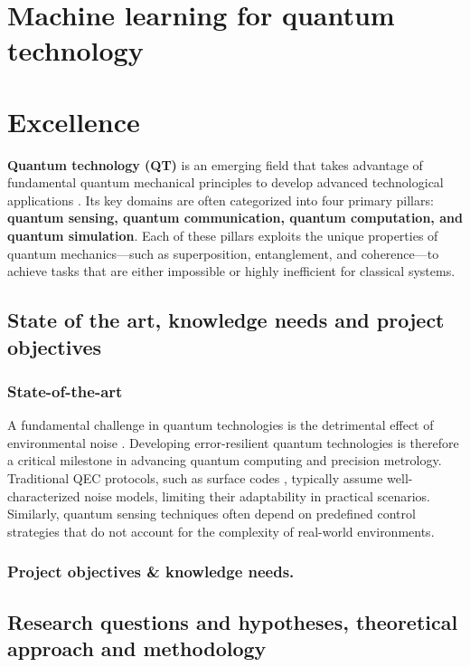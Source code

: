 \documentclass{scrreprt}
\author{Francesco Massel}
\date{\today}
\title{}
\begin{document}
\section*{\LARGE{Machine learning for quantum technology}}


\section{Excellence}
\label{sec:orgc59a8d0}
\textbf{Quantum technology (QT)} is an emerging field that takes advantage of fundamental quantum mechanical principles to develop advanced technological applications \cite{macfarlane_quantum_2003-1, acin_quantum_2018}. Its key domains are often categorized into four primary pillars: \textbf{quantum sensing, quantum communication, quantum computation, and quantum simulation}. Each of these pillars exploits the unique properties of quantum mechanics—such as superposition, entanglement, and coherence—to achieve tasks that are either impossible or highly inefficient for classical systems.
\subsection{State of the art, knowledge needs and project objectives}

\subsubsection*{State-of-the-art}

A fundamental challenge in quantum technologies is the detrimental
effect of environmental noise \cite{gardiner_quantum_2004}. Developing
error-resilient quantum technologies is therefore a critical milestone
in advancing quantum computing and precision metrology. Traditional
QEC protocols, such as surface codes \cite{fowler_surface_2012},
typically assume well-characterized noise models, limiting their
adaptability in practical scenarios. Similarly, quantum sensing
techniques often depend on predefined control strategies that do not
account for the complexity of real-world environments.


\subsubsection*{Project objectives \& knowledge needs.}


\subsection{Research questions and hypotheses, theoretical approach and methodology}
\end{document}
